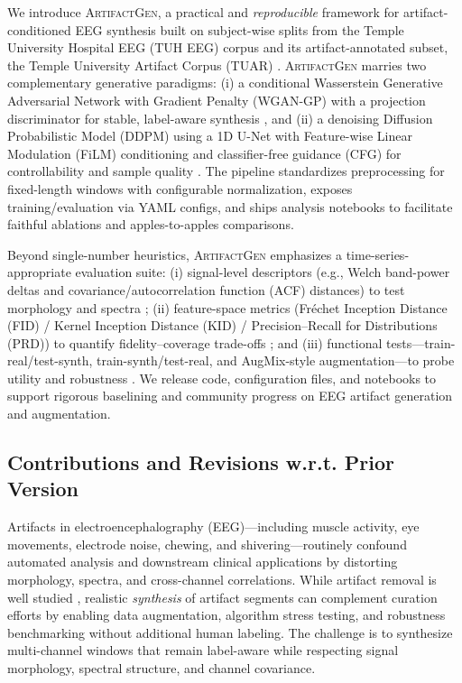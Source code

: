 \documentclass{article}
\begin{document}
We introduce \textsc{ArtifactGen}, a practical and \emph{reproducible} framework for artifact-conditioned EEG synthesis built on subject-wise splits from the Temple University Hospital EEG (TUH EEG) corpus and its artifact-annotated subset, the Temple University Artifact Corpus (TUAR) \citep{hamid2020tuar}. \textsc{ArtifactGen} marries two complementary generative paradigms: (i) a conditional Wasserstein Generative Adversarial Network with Gradient Penalty (WGAN-GP) with a projection discriminator for stable, label-aware synthesis \citep{gulrajani2017wgan,miyato2018cgan}, and (ii) a denoising Diffusion Probabilistic Model (DDPM) using a 1D U-Net with Feature-wise Linear Modulation (FiLM) conditioning \citep{perez2018filmvisual} and classifier-free guidance (CFG) for controllability and sample quality \citep{ho2020denoisingprobabilistic,ho2022classifierfree}. The pipeline standardizes preprocessing for fixed-length windows with configurable normalization, exposes training/evaluation via YAML configs, and ships analysis notebooks to facilitate faithful ablations and apples-to-apples comparisons.

Beyond single-number heuristics, \textsc{ArtifactGen} emphasizes a time-series-appropriate evaluation suite: (i) signal-level descriptors (e.g., Welch band-power deltas and covariance/autocorrelation function (ACF) distances) to test morphology and spectra \citep{welch1967usefast}; (ii) feature-space metrics (Fréchet Inception Distance (FID) / Kernel Inception Distance (KID) / Precision–Recall for Distributions (PRD)) to quantify fidelity–coverage trade-offs \citep{heusel2017ganstrained,binkowski2018demystifyingmmd,sajjadi2018assessingprecision}; and (iii) functional tests—train-real/test-synth, train-synth/test-real, and AugMix-style augmentation—to probe utility and robustness \citep{hendrycks2020augmixsimple}. We release code, configuration files, and notebooks to support rigorous baselining and community progress on EEG artifact generation and augmentation.

\subsection{Contributions and Revisions w.r.t. Prior Version}
Artifacts in electroencephalography (EEG)—including muscle activity, eye movements, electrode noise, chewing, and shivering—routinely confound automated analysis and downstream clinical applications by distorting morphology, spectra, and cross-channel correlations. While artifact removal is well studied \citep{uriguen2015eegartifact,jiang2019removalartifacts}, realistic \emph{synthesis} of artifact segments can complement curation efforts by enabling data augmentation, algorithm stress testing, and robustness benchmarking without additional human labeling. The challenge is to synthesize multi-channel windows that remain label-aware while respecting signal morphology, spectral structure, and channel covariance.
\end{document}
